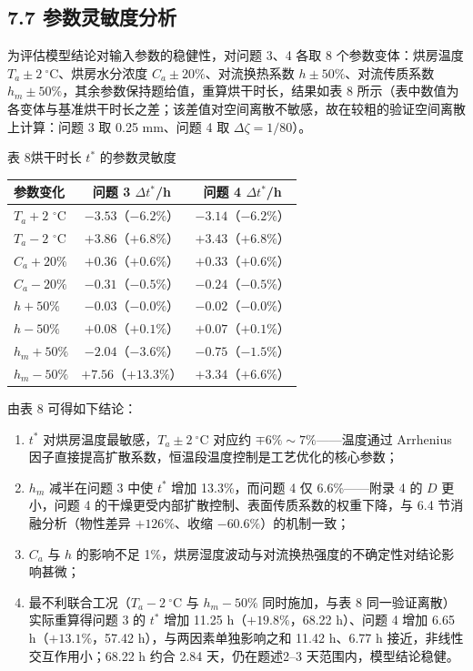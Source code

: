 \documentclass[12pt,a4paper]{ctexart}
\begin{document}
\subsection{7.7 参数灵敏度分析}

为评估模型结论对输入参数的稳健性，对问题 3、4 各取 8 个参数变体：烘房温度 $T_a\pm2\ ^\circ$C、烘房水分浓度 $C_a\pm20\%$、对流换热系数 $h\pm50\%$、对流传质系数 $h_m\pm50\%$，其余参数保持题给值，重算烘干时长，结果如表 8 所示（表中数值为各变体与基准烘干时长之差；该差值对空间离散不敏感，故在较粗的验证空间离散上计算：问题 3 取 0.25 mm、问题 4 取 $\Delta\zeta=1/80$）。

\begin{center}
\begin{minipage}{\textwidth}
\centering
{\heiti{} 表 8\quad 烘干时长 $t^*$ 的参数灵敏度}
\par\medskip
{\begin{tabular}{lcc}
\toprule
参数变化 & 问题 3 $\Delta t^*$/h & 问题 4 $\Delta t^*$/h \\
\midrule
$T_a+2$ $^\circ$C & $-3.53$（$-6.2\%$） & $-3.14$（$-6.2\%$） \\
$T_a-2$ $^\circ$C & $+3.86$（$+6.8\%$） & $+3.43$（$+6.8\%$） \\
$C_a+20\%$ & $+0.36$（$+0.6\%$） & $+0.33$（$+0.6\%$） \\
$C_a-20\%$ & $-0.31$（$-0.5\%$） & $-0.24$（$-0.5\%$） \\
$h+50\%$ & $-0.03$（$-0.0\%$） & $-0.02$（$-0.0\%$） \\
$h-50\%$ & $+0.08$（$+0.1\%$） & $+0.07$（$+0.1\%$） \\
$h_m+50\%$ & $-2.04$（$-3.6\%$） & $-0.75$（$-1.5\%$） \\
$h_m-50\%$ & $+7.56$（$+13.3\%$） & $+3.34$（$+6.6\%$） \\
\bottomrule
\end{tabular}}
\end{minipage}
\end{center}

由表 8 可得如下结论：
\begin{enumerate}[label=(\arabic*),leftmargin=3em]
\item $t^*$ 对烘房温度最敏感，$T_a\pm2\ ^\circ$C 对应约 $\mp6\%\sim7\%$——温度通过 Arrhenius 因子直接提高扩散系数，恒温段温度控制是工艺优化的核心参数；
\item $h_m$ 减半在问题 3 中使 $t^*$ 增加 13.3\%，而问题 4 仅 6.6\%——附录 4 的 $D$ 更小，问题 4 的干燥更受内部扩散控制、表面传质系数的权重下降，与 6.4 节消融分析（物性差异 $+126\%$、收缩 $-60.6\%$）的机制一致；
\item $C_a$ 与 $h$ 的影响不足 1\%，烘房湿度波动与对流换热强度的不确定性对结论影响甚微；
\item 最不利联合工况（$T_a-2\ ^\circ$C 与 $h_m-50\%$ 同时施加，与表 8 同一验证离散）实际重算得问题 3 的 $t^*$ 增加 11.25 h（$+19.8\%$，68.22 h）、问题 4 增加 6.65 h（$+13.1\%$，57.42 h），与两因素单独影响之和 11.42 h、6.77 h 接近，非线性交互作用小；68.22 h 约合 2.84 天，仍在题述2--3 天范围内，模型结论稳健。
\end{enumerate}
\end{document}
